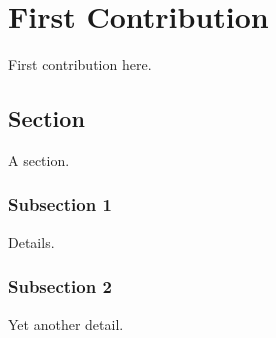 \chapter{First Contribution}\label{chap:contrib1}

First contribution here.

\section{Section}

A section.

\subsection{Subsection 1}

Details.

\subsection{Subsection 2}

Yet another detail.

